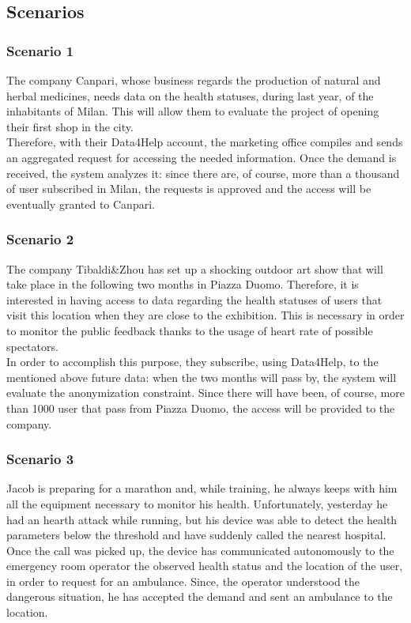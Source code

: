 \subsection{Scenarios}

\subsubsection{Scenario 1}
The company Canpari, whose business regards the production of natural and herbal medicines, needs data on the health statuses, during last year, of the inhabitants of Milan. This will allow them to evaluate the project of opening their first shop in the city. \\
Therefore, with their Data4Help account, the marketing office compiles and sends an aggregated request for accessing the needed information. 
Once the demand is received, the system analyzes it: since there are, of course, more than a thousand of user subscribed in Milan, the requests is approved and the access will be eventually granted to Canpari. 

\subsubsection{Scenario 2}
The company Tibaldi\&Zhou has set up a shocking outdoor art show that will take place in the following two months in Piazza Duomo.
Therefore, it is interested in having access to data regarding the health statuses of users that visit this location when they are close to the exhibition.
This is necessary in order to monitor the public feedback thanks to the usage of heart rate of possible spectators. \\
In order to accomplish this purpose, they subscribe, using Data4Help, to the mentioned above future data: when the two months will pass by, the system will evaluate the anonymization constraint. Since there will have been, of course, more than 1000 user that pass from Piazza Duomo, the access will be provided to the company. 

\subsubsection{Scenario 3}
Jacob is preparing for a marathon and, while training, he always keeps with him all the equipment necessary to monitor his health.
Unfortunately, yesterday he had an hearth attack while running, but his device was able to detect the health parameters below the threshold and have suddenly called the nearest hospital. \\
Once the call was picked up, the device has communicated autonomously to the emergency room operator the observed health status and the location of the user, in order to request for an ambulance. 
Since, the operator understood the dangerous situation, he has accepted the demand and sent an ambulance to the location.

